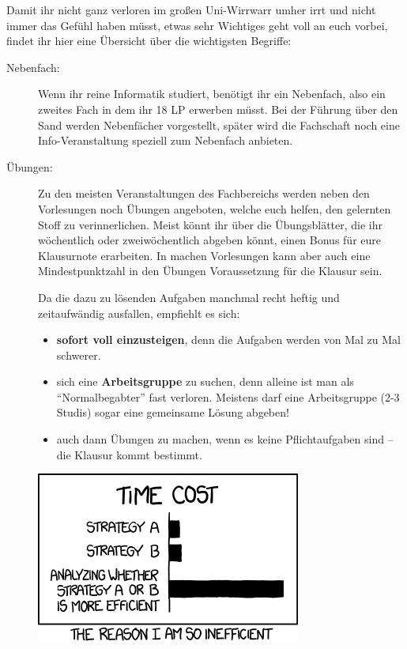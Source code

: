 Damit ihr nicht ganz verloren im gro\ss en Uni-Wirrwarr umher irrt und
  nicht immer das Gefühl haben müsst, etwas sehr Wichtiges geht
  voll an euch vorbei, findet ihr hier eine Übersicht über die wichtigsten Begriffe:

\begin{description}

\item [Nebenfach:] Wenn ihr reine Informatik studiert, benötigt ihr ein Nebenfach, also ein zweites Fach in dem ihr 18 LP erwerben müsst. Bei der Führung über den Sand werden Nebenfächer vorgestellt, später wird die Fachschaft noch eine Info-Veranstaltung speziell zum Nebenfach anbieten. 

\item [Übungen:] Zu den meisten Veranstaltungen des Fachbereichs werden neben den Vorlesungen noch Übungen angeboten, welche euch helfen, den gelernten Stoff zu verinnerlichen. Meist könnt ihr über die Übungsblätter, die ihr wöchentlich oder zweiwöchentlich abgeben könnt, einen Bonus für eure Klausurnote erarbeiten. In machen Vorlesungen kann aber auch eine Mindestpunktzahl in den Übungen Voraussetzung für die Klausur sein.

Da die dazu zu lösenden Aufgaben manchmal recht heftig und zeitaufwändig ausfallen, empfiehlt es sich:

\begin{itemize}

\item \textbf{sofort voll einzusteigen}, denn die Aufgaben werden von Mal
  zu Mal schwerer.

\item sich eine \textbf{Arbeitsgruppe} zu suchen, denn alleine ist man
  als "`Normalbegabter"' fast verloren. Meistens darf eine
  Arbeitsgruppe (2-3 Studis) sogar eine gemeinsame Lösung abgeben!

\item auch dann Übungen zu machen, wenn es keine Pflichtaufgaben sind --
  die Klausur kommt bestimmt.

\end {itemize}

\begin{center}
\includegraphics[width=0.5\hsize]{info/xkcd/efficiency.png}
\end{center}



\end{description}
